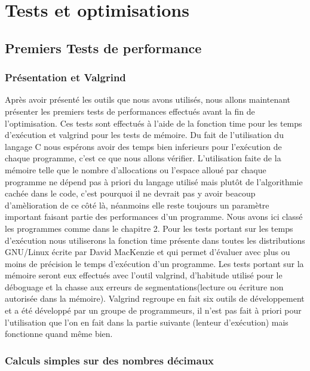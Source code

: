
\chapter{Tests et optimisations}
\label{chap:tests et optimisations}

\section{Premiers Tests de performance}

\subsection{Pr\'esentation et Valgrind}
Apr\`es avoir pr\'esent\'e les outils que nous avons utilis\'es, nous allons maintenant pr\'esenter les premiers tests de performances effectu\'es 
avant la fin de l'optimisation.
Ces tests sont effectu\'es \`a l'aide de la fonction time pour les temps d'ex\'ecution et valgrind\citep{valgrind} pour les tests de m\'emoire.
Du fait de l'utilisation du langage C nous esp\'erons avoir des temps bien inferieurs pour l'ex\'ecution de chaque programme, c'est ce que nous allons
 v\'erifier.
L'utilisation faite de la m\'emoire telle que le nombre d'allocations ou l'espace allou\'e par chaque programme ne d\'epend pas \`a priori du langage
 utilis\'e mais plut\^ot de l'algorithmie cach\'ee dans le code, c'est pourquoi il ne devrait pas y avoir beacoup d'am\`elioration de ce c\^ot\'e l\`a,
n\'eanmoins elle reste toujours un param\`etre important faisant partie des performances d'un programme.
Nous avons ici class\'e les programmes comme dans le chapitre 2.
Pour les tests portant sur les temps d'ex\'ecution nous utiliserons la fonction time pr\'esente dans toutes les distributions GNU/Linux \'ecrite par David MacKenzie 
et qui permet d'\'evaluer avec plus ou moins de pr\'ecision le temps d'ex\'ecution d'un programme.
Les tests portant sur la m\'emoire seront eux effectu\'es avec l'outil valgrind, d'habitude utilis\'e pour le d\'eboguage et la chasse aux erreurs de segmentations(lecture ou \'ecriture non autoris\'ee dans la m\'emoire).
Valgrind regroupe en fait six outils de d\'eveloppement et a \'et\'e d\'evelopp\'e par un groupe de programmeurs, il n'est pas fait \`a priori pour l'utilisation que l'on en fait dans la partie suivante (lenteur d'ex\'ecution) mais fonctionne quand m\^eme bien.
 

\subsection{Calculs simples sur des nombres d\'ecimaux}

